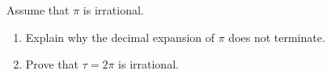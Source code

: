 Assume that $\pi$ is irrational.
\begin{enumerate}
\item[(a)] Explain why the decimal expansion of $\pi$ does not terminate.
\item[(b)] Prove that $\tau=2\pi$ is irrational.
\end{enumerate}
